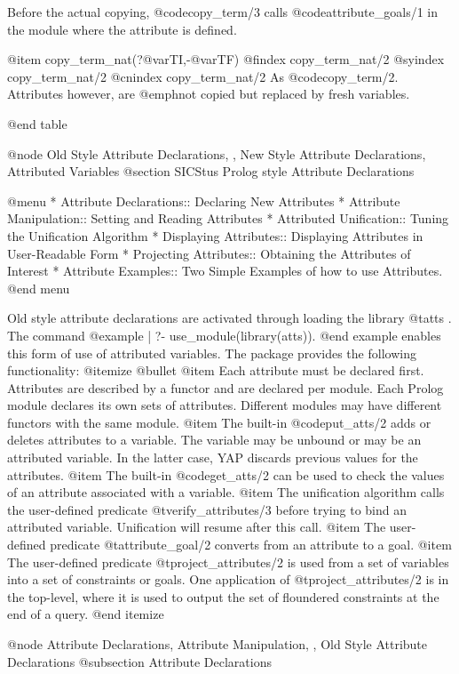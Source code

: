 {{{{{{{{{Before the actual copying, @code{copy_term/3} calls
@code{attribute_goals/1} in the module where the attribute is
defined.

@item copy_term_nat(?@var{TI},-@var{TF}) 
@findex copy_term_nat/2
@syindex copy_term_nat/2
@cnindex copy_term_nat/2
As @code{copy_term/2}.  Attributes however, are @emph{not} copied but replaced
by fresh variables.

@end table

@node Old Style Attribute Declarations, , New Style Attribute Declarations, Attributed Variables
@section SICStus Prolog style Attribute Declarations

@menu
* Attribute Declarations:: Declaring New Attributes
* Attribute Manipulation:: Setting and Reading Attributes
* Attributed Unification:: Tuning the Unification Algorithm
* Displaying Attributes:: Displaying Attributes in User-Readable Form
* Projecting Attributes:: Obtaining the Attributes of Interest
* Attribute Examples:: Two Simple Examples of how to use Attributes.
@end menu

Old style attribute declarations are activated through loading the library @t{atts} . The command
@example
| ?- use_module(library(atts)).
@end example
enables this form of use of attributed variables. The package provides the
following functionality:
@itemize @bullet
@item Each attribute must be declared first. Attributes are described by a functor
and are declared per module. Each Prolog module declares its own sets of
attributes. Different modules may have different functors with the same
module.
@item The built-in @code{put_atts/2} adds or deletes attributes to a
variable. The variable may be unbound or may be an attributed
variable. In the latter case, YAP discards previous values for the
attributes.
@item The built-in @code{get_atts/2} can be used to check the values of
an attribute associated with a variable.
@item The unification algorithm calls the user-defined predicate
@t{verify_attributes/3} before trying to bind an attributed
variable. Unification will resume after this call.
@item The user-defined predicate
@t{attribute_goal/2} converts from an attribute to a goal.
@item The user-defined predicate
@t{project_attributes/2} is used from a set of variables into a set of
constraints or goals. One application of @t{project_attributes/2} is in
the top-level, where it is used to output the set of
floundered constraints at the end of a query.
@end itemize

@node Attribute Declarations, Attribute Manipulation, , Old Style Attribute Declarations
@subsection Attribute Declarations

}}}}}}}}}
